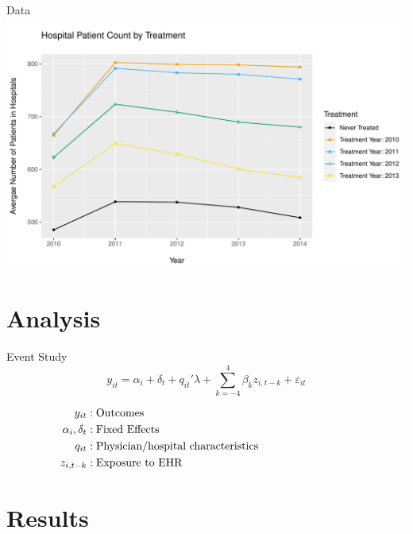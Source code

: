 \documentclass[10pt]{beamer}
\begin{document}
\begin{frame}{Data}
\centering
    \includegraphics[scale=.5]{Objects/cont_treatment_graph.pdf}
    
\end{frame}


\section{Analysis}


\begin{frame}{Event Study}
\begin{equation*}
    y_{it}=\alpha_i+\delta_t+q_{it}'\lambda+\sum_{k=-4}^4 \beta_kz_{i,t-k} + \varepsilon_{it}
\end{equation*}

\vspace{4mm}

\begin{align*}
    y_{it} &: \text{Outcomes} \hspace{30mm}\\
    \alpha_i, \delta_t &: \text{Fixed Effects}\hspace{30mm}\\
    q_{it} &: \text{Physician/hospital characteristics}\hspace{30mm}\\
    z_{i,t-k} &: \text{Exposure to EHR} \hspace{30mm}
\end{align*}

    
\end{frame}

\section{Results}
\end{document}

